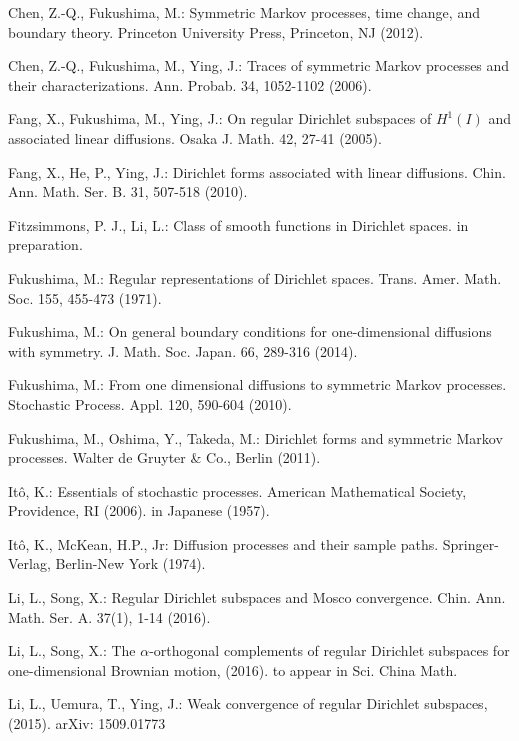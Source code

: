 \documentclass[a4paper]{amsart}
\theoremstyle{definition}
\theoremstyle{remark}
\numberwithin{equation}{section}
\begin{document}
\begin{thebibliography}{}

Chen, Z.-Q., Fukushima, M.: Symmetric Markov processes, time change, and boundary theory. Princeton University Press, Princeton, NJ (2012).

Chen, Z.-Q., Fukushima, M., Ying, J.: Traces of symmetric Markov processes and their characterizations. Ann. Probab. 34, 1052-1102 (2006).

Fang, X., Fukushima, M., Ying, J.: On regular Dirichlet subspaces of $H^1(I)$ and associated linear diffusions. Osaka J. Math. 42, 27-41 (2005).

Fang, X., He, P., Ying, J.: Dirichlet forms associated with linear diffusions. Chin. Ann. Math. Ser. B. 31, 507-518 (2010).

Fitzsimmons, P. J., Li, L.: Class of smooth functions in Dirichlet spaces.  in preparation.

Fukushima, M.: Regular representations of Dirichlet spaces. Trans. Amer. Math. Soc. 155, 455-473 (1971).

Fukushima, M.: On general boundary conditions for one-dimensional diffusions with symmetry. J. Math. Soc. Japan. 66, 289-316 (2014).

Fukushima, M.: From one dimensional diffusions to symmetric Markov processes. Stochastic Process. Appl. 120, 590-604 (2010).

Fukushima, M., Oshima, Y., Takeda, M.: Dirichlet forms and symmetric Markov processes. Walter de Gruyter \& Co., Berlin (2011).

It\^o, K.: Essentials of stochastic processes. American Mathematical Society, Providence, RI (2006). in Japanese (1957).

It\^o, K., McKean, H.P., Jr: Diffusion processes and their sample paths. Springer-Verlag, Berlin-New York (1974).

Li, L., Song, X.: Regular Dirichlet subspaces and Mosco convergence. Chin. Ann. Math. Ser. A. 37(1), 1-14 (2016).

Li, L., Song, X.: The $\alpha$-orthogonal complements of regular Dirichlet  subspaces for one-dimensional Brownian motion, (2016). to appear in Sci. China Math.

Li, L., Uemura, T., Ying, J.: Weak convergence of regular Dirichlet subspaces, (2015). arXiv: 1509.01773


\end{thebibliography}
\end{document}
